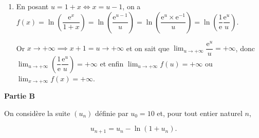 \begin{enumerate}
\begin{enumerate}
 $\ln a - \ln b = \ln \dfrac ab$

		\item %
En posant $u = 1 + x \iff x = u - 1$, on a $f(x) = \ln \left(\dfrac{\text{e}^x}{1 + x}\right) = \ln \left(\dfrac{\text{e}^{u - 1}}{u}\right) = \ln \left(\dfrac{\text{e}^{u}\times \text{e}^{-1}}{u}\right) = \ln \left(\dfrac{1}{\text{e}}\dfrac{\text{e}^{u}}{u}\right)$.
		
Or $x \to + \infty \implies x + 1 = u \to + \infty$ et on sait que $\displaystyle\lim_{u \to + \infty} \dfrac{\text{e}^u}{u} = + \infty$, donc $\displaystyle\lim_{u \to + \infty} \left(\dfrac{1}{\text{e}}\dfrac{\text{e}^{u}}{u}\right) = + \infty$ et enfin $\displaystyle\lim_{u \to + \infty} f(u) = + \infty$ ou $\displaystyle\lim_{x \to + \infty} f(x) = + \infty$.
	\end{enumerate}
\end{enumerate}

\medskip

\textbf{Partie B}

\medskip

On considère la suite $\left(u_n\right)$ définie par $u_0 = 10$ et, pour tout entier naturel $n$,

\[u_{n+1} = u_n - \ln \left(1 + u_n\right).\]


\medskip

